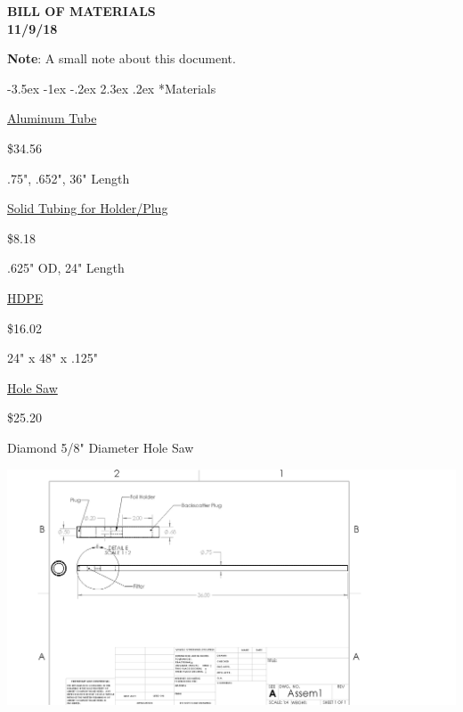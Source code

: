 \documentclass[10pt]{article}
\makeatletter
\renewcommand\section{\@startsection{section}{1}{\z@}%
                                  {-3.5ex \@plus -1ex \@minus -.2ex}%
                                  {2.3ex \@plus.2ex}%
                                  {\normalfont\bfseries}}
\makeatother
\begin{document}
{\large
  \begin{center}
    {\bf BILL OF MATERIALS  \\ 
         11/9/18 \\
    }
  \end{center}
}
 
{\small {\bf Note}:
A small note about this document.}

\section*{Materials}

\href{https://www.onlinemetals.com/merchant.cfm?pid=12805&step=4&showunits=inches&id=946&top_cat=60}{Aluminum Tube}

\$34.56

.75", .652", 36" Length

\vspace{1cm}

\href{https://www.onlinemetals.com/merchant.cfm?pid=7685&step=4&showunits=inches&id=288&top_cat=60}{Solid Tubing for Holder/Plug}

\$8.18

.625" OD, 24" Length

\vspace{1cm}

\href{https://www.eplastics.com/HDPEBLK0125SR24X48}{HDPE}

\$16.02

24" x 48" x .125"

\vspace{1cm}

\href{https://www.grainger.com/product/MORSE-5-8-Dia-Hole-Saw-for-Masonry-40L157}{Hole Saw}

\$25.20

Diamond 5/8" Diameter Hole Saw 

\includegraphics[width=20cm]{drawing.png}
\end{document}
